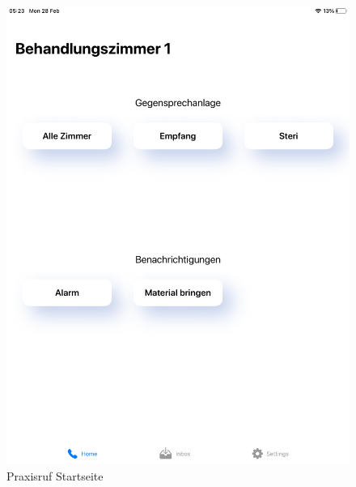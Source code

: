 \begin{figure}[h]
    \centering
    \begin{minipage}[b]{0.4\textwidth}
        \includegraphics[width=\textwidth]{graphics/screenshots/app/home}
        \caption{Praxisruf Startseite}
    \end{minipage}
    \hfill
    \begin{minipage}[b]{0.4\textwidth}

\end{minipage}
\end{figure}

